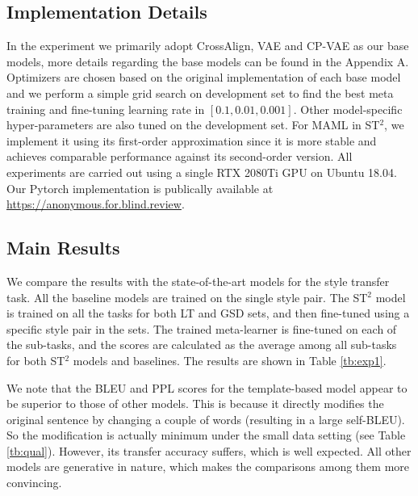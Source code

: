 \subsection{Implementation Details}
In the experiment we primarily adopt CrossAlign, VAE and CP-VAE as our base models, more details regarding the base models can be found in the Appendix A. Optimizers are chosen based on the original implementation of each base model and we perform a simple grid search on development set to find the best meta training and fine-tuning learning rate in $[0.1, 0.01, 0.001]$. Other model-specific hyper-parameters are also tuned on the development set. For MAML in ST$^2$, we implement it using its first-order approximation since it is more stable and achieves comparable performance against its second-order version. All experiments are carried out using a single RTX 2080Ti GPU on Ubuntu 18.04. Our Pytorch implementation is publically available at \url{https://anonymous.for.blind.review}.

\subsection{Main Results}
\label{sec:st}

We compare the results with the state-of-the-art models for the style transfer task. All the baseline models are trained on the single style pair. The ST$^2$ model is trained on all the tasks for both LT and GSD sets, and then fine-tuned using a specific style pair in the sets. The trained meta-learner is fine-tuned on each of the sub-tasks, and the scores are calculated as the average among all sub-tasks for both ST$^2$ models and baselines. The results are shown in Table \ref{tb:exp1}.

We note that the BLEU and PPL scores for the template-based model appear
to be superior to those of other models. This is because it directly
modifies the original sentence by changing a couple of words (resulting in a large self-BLEU). So the modification
is actually minimum under the small data setting (see Table \ref{tb:qual}). However, its transfer accuracy suffers, which is
well expected. All other models are generative in nature, which makes the comparisons among them more convincing.

